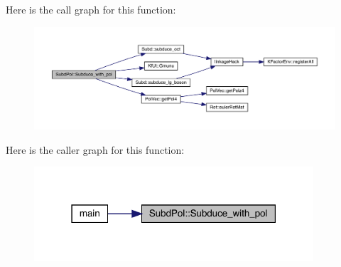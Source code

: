 Here is the call graph for this function\+:
\nopagebreak
\begin{figure}[H]
\begin{center}
\leavevmode
\includegraphics[width=350pt]{db/d8a/namespaceSubdPol_a0c27e6a0353d158613d8d77e3c0ebbe7_cgraph}
\end{center}
\end{figure}
Here is the caller graph for this function\+:
\nopagebreak
\begin{figure}[H]
\begin{center}
\leavevmode
\includegraphics[width=295pt]{db/d8a/namespaceSubdPol_a0c27e6a0353d158613d8d77e3c0ebbe7_icgraph}
\end{center}
\end{figure}
